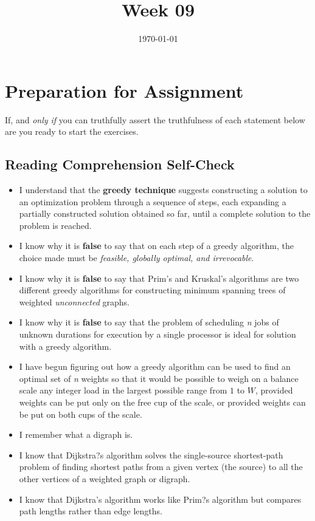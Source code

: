 \documentclass[12pt]{amsart}
\title{Week 09}
\date{\today}
\begin{document}
\maketitle

\section{Preparation for Assignment}
If, and \textit{only if} you can truthfully assert the truthfulness of each statement below are you ready to start the exercises.
\subsection {Reading Comprehension Self-Check}
\begin{itemize}
\item I understand that the \textbf{greedy technique} suggests constructing a solution to an optimization problem through a sequence of steps, each expanding a partially constructed solution obtained so far, until a complete solution to the problem is reached.
 \item I know why it is \textbf{false} to say that on each step of a greedy algorithm, the choice made must be \textit{feasible, globally optimal, and irrevocable}.
 \item I know why it is \textbf{false} to say that Prim\textquoteright{}s and Kruskal\textquoteright{}s algorithms are two different greedy algorithms for constructing minimum spanning trees of weighted \textit{unconnected} graphs.
 \item I know why it is \textbf{false} to say that the problem of scheduling \textit{n} jobs of unknown durations for execution by a single processor is ideal for solution with a greedy algorithm.
 \item I have begun figuring out how a greedy algorithm can be used to find an optimal set of \textit{n} weights so that it would be possible to weigh on a balance scale any integer load in the largest possible range from $1$ to $W$, provided weights can be put only on the free cup of the scale, or provided weights can be put on both cups of the scale.
 \item I remember what a digraph is.
 \item I know that Dijkstra?s algorithm solves the single-source shortest-path problem of finding shortest paths from a given vertex (the source) to all the other vertices of a weighted graph or digraph.
 \item I know that Dijkstra\textquoteright{}s algorithm works like Prim?s algorithm but compares path lengths rather than edge lengths.

\end{itemize}
\end{document}
